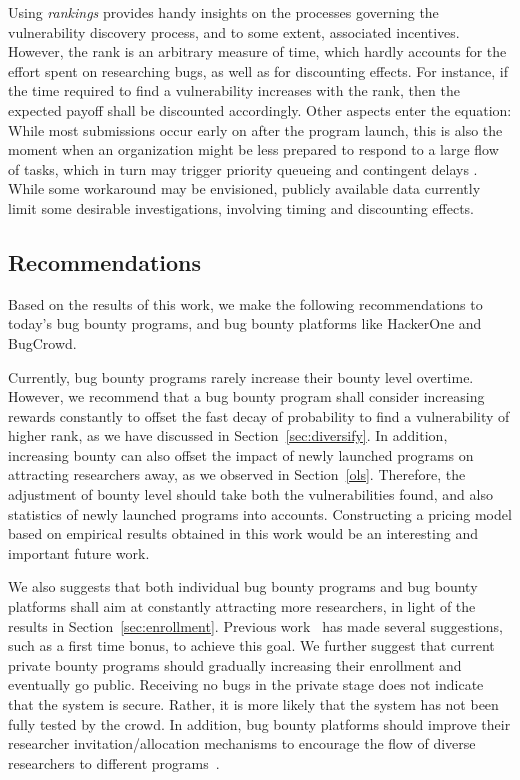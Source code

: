 Using {\it rankings} provides handy insights on the processes governing the vulnerability discovery process, and to some extent, associated incentives. However, the rank is an arbitrary measure of time, which hardly accounts for the effort spent on researching bugs, as well as for discounting effects. For instance, if the time required to find a vulnerability increases with the rank, then the expected payoff shall be discounted accordingly. Other aspects enter the equation: While most submissions occur early on after the program launch, this is also the moment when an organization might be less prepared to respond to a large flow of tasks, which in turn may trigger priority queueing and contingent delays \cite{maillart2011quantification}. While some workaround may be envisioned, publicly available data currently limit some desirable investigations, involving timing and discounting effects.\\

\subsection{Recommendations}

Based on the results of this work, we make the following recommendations to today's bug bounty programs, and bug bounty platforms like HackerOne and BugCrowd.

Currently, bug bounty programs rarely increase their bounty level overtime. However, we recommend that a bug bounty program shall consider increasing rewards constantly to offset the fast decay of probability to find a vulnerability of higher rank, as we have discussed in Section~\ref{sec:diversify}. In addition, increasing bounty can also offset the impact of newly launched programs on attracting researchers away, as we observed in Section~\ref{ols}. Therefore, the adjustment of bounty level should take both the vulnerabilities found, and also statistics of newly launched programs into accounts. Constructing a pricing model based on empirical results obtained in this work would be an interesting and important future work.

We also suggests that both individual bug bounty programs and bug bounty platforms shall aim at constantly attracting more researchers, in light of the results in Section~\ref{sec:enrollment}. Previous work~\cite{zhao2015empirical} has made several suggestions, such as a first time bonus, to achieve this goal. We further suggest that current private bounty programs should gradually increasing their enrollment and eventually go public. Receiving no bugs in the private stage does not indicate that the system is secure. Rather, it is more likely that the system has not been fully tested by the crowd. In addition, bug bounty platforms should improve their researcher invitation/allocation mechanisms to encourage the flow of diverse researchers to different programs~\cite{zhao2016crowdsourced}.


